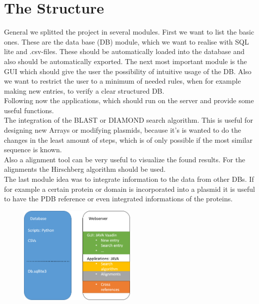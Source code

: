 \documentclass[]{article}
\begin{document}
\section{ The Structure}
General we splitted the project in several modules. First we want to list the basic ones. These are the data base (DB) module, which we want to realise with SQL lite and .csv-files. These should be automatically loaded into the database and also should be automatically exported.
The next most important module is the GUI which should give the user the possibility of intuitive usage of the DB. Also we want to restrict the user to a minimum of needed rules, when for example making new entries, to verify a clear structured DB.\\
Following now the applications, which should run on the server and provide some useful functions.\\
The integration of the BLAST or DIAMOND search algorithm. This is useful for designing new Arrays or modifying plasmids, because it's is wanted to do the changes in the least amount of steps, which is of only possible if the most similar sequence is known.\\
Also a alignment tool can be very useful to visualize the found results. For the alignments the Hirschberg algorithm should be used.\\
The last module idea was to integrate information to the data from other DBs. If for example a certain protein or domain is incorporated into a plasmid it is useful to have the PDB reference or even integrated informations of the proteins.
	\begin{figure}[h]
		\centering
		\includegraphics[width=0.5\textwidth]{img/Structure.png}
	\end{figure}
\end{document}
